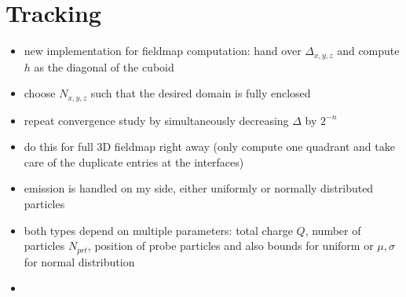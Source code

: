 \section{Tracking}
\begin{itemize}
  \item new implementation for fieldmap computation: hand over $\Delta_{x,y,z}$ and compute $h$ as the diagonal of the cuboid
  \item choose $N_{x,y,z}$ such that the desired domain is fully enclosed
  \item repeat convergence study by simultaneously decreasing $\Delta$ by $2^{-n}$

  \item do this for full 3D fieldmap right away (only compute one quadrant and take care of the duplicate entries at the interfaces)
\end{itemize}

\begin{itemize}
  \item emission is handled on my side, either uniformly or normally distributed particles
  \item both types depend on multiple parameters: total charge $Q$, number of particles $N_{prt}$, position of probe particles and also bounds for uniform or $\mu, \sigma$ for normal distribution
\end{itemize}

\begin{itemize}
  \item 
\end{itemize}

\begin{center}
\begin{figure}
  
\end{figure}
\end{center}
